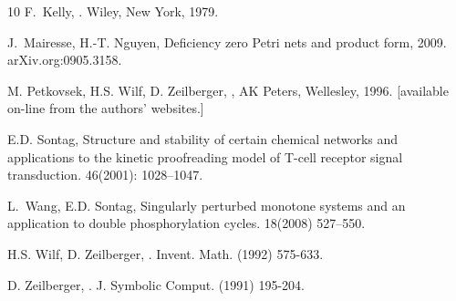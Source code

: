 \documentclass[11pt]{article}
\begin{document}
\begin{thebibliography}{10}
F.~Kelly,
.
Wiley, New York, 1979.

J.~Mairesse, H.-T. Nguyen,
Deficiency zero Petri nets and product form, 2009.
arXiv.org:0905.3158.

M. Petkovsek, H.S. Wilf, D. Zeilberger,
, AK Peters, Wellesley, 1996.
[available on-line from the authors' websites.]

E.D. Sontag,
Structure and stability of certain chemical networks and applications
  to the kinetic proofreading model of {T}-cell receptor signal transduction.
46(2001): 1028--1047.

L.~Wang, E.D. Sontag,
Singularly perturbed monotone systems and an application to double
  phosphorylation cycles.
18(2008) 527--550.

H.S. Wilf, D. Zeilberger,
.
Invent. Math.
(1992) 575-633.

D. Zeilberger,
.
J. Symbolic Comput.
(1991) 195-204.

\end{thebibliography}
\end{document}
